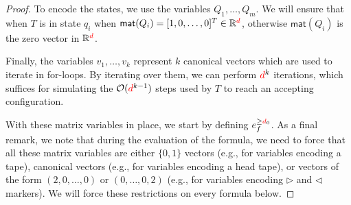 \begin{proof}
    To encode the states, we use the variables $Q_1,\ldots,Q_m$. We will ensure that when $T$ is in state 
    $q_i$ when
    $\mathsf{mat}(Q_i)=[1,0,\ldots,0]^T\in\mathbb{R}^{\color{red} d}$, otherwise $\mathsf{mat}(Q_i)$ is the zero 
    vector in $\mathbb{R}^{\color{red} d}$.	

    Finally, the variables $v_1,\ldots,v_{k}$ represent $k$ canonical vectors  which are used to iterate 
    in for-loops. By iterating over them, we can perform ${\color{red} d}^{k}$ iterations, 
    which suffices for simulating the $\mathcal{O}({\color{red} d}^{k-1})$ steps used by $T$ to reach an accepting configuration.
    
    With these matrix variables in place, we start by defining $e_f^{\geq {\color{red} d}_0}$. As a final remark, we note that during the evaluation of the formula, we need to force that all these matrix variables are either $\{0,1\}$ vectors (e.g., for variables encoding a tape), canonical vectors (e.g., for variables encoding a head tape), or vectors of the form $(2,0,\ldots,0)$ or $(0, \ldots, 0, 2)$ (e.g., for variables encoding $\rhd$ and $\lhd$ markers).
    We will force these restrictions on every formula below. 


\end{proof}
